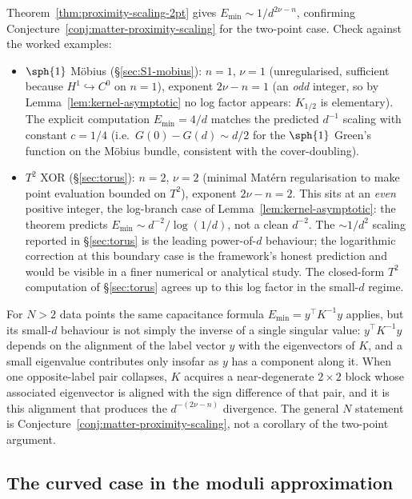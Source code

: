 \begin{remark}
\label{rem:proximity-exponent-check}
Theorem~\ref{thm:proximity-scaling-2pt} gives
$E_{\min}\sim 1/d^{2\nu-n}$, confirming
Conjecture~\ref{conj:matter-proximity-scaling} for the two-point
case. Check against the worked examples:
\begin{itemize}[leftmargin=2em]
\item $\sph{1}$ M\"obius (\S\ref{sec:S1-mobius}): $n=1$, $\nu=1$
(unregularised, sufficient because $H^1\hookrightarrow C^0$ on
$n=1$), exponent $2\nu-n=1$ (an \emph{odd} integer, so by
Lemma~\ref{lem:kernel-asymptotic} no log factor appears: $K_{1/2}$
is elementary). The explicit computation $E_{\min}=4/d$ matches the
predicted $d^{-1}$ scaling with constant $c=1/4$ (i.e.\
$G(0)-G(d)\sim d/2$ for the $\sph{1}$ Green's function on the
M\"obius bundle, consistent with the cover-doubling).
\item $T^2$ XOR (\S\ref{sec:torus}): $n=2$, $\nu=2$ (minimal
Mat\'ern regularisation to make point evaluation bounded on
$T^2$), exponent $2\nu-n=2$. This sits at an \emph{even}
positive integer, the log-branch case of
Lemma~\ref{lem:kernel-asymptotic}: the theorem predicts
$E_{\min}\sim d^{-2}/\log(1/d)$, not a clean $d^{-2}$. The
$\sim 1/d^2$ scaling reported in \S\ref{sec:torus} is the leading
power-of-$d$ behaviour; the logarithmic correction at this
boundary case is the framework's honest prediction and would be
visible in a finer numerical or analytical study. The closed-form
$T^2$ computation of \S\ref{sec:torus} agrees up to this log
factor in the small-$d$ regime.
\end{itemize}
For $N>2$ data points the same capacitance formula
$E_{\min}=y^\top K^{-1}y$ applies, but its small-$d$ behaviour is
not simply the inverse of a single singular value: $y^\top K^{-1}y$
depends on the alignment of the label vector $y$ with the
eigenvectors of $K$, and a small eigenvalue contributes only insofar
as $y$ has a component along it. When one opposite-label pair
collapses, $K$ acquires a near-degenerate $2\times 2$ block whose
associated eigenvector is aligned with the sign difference of that
pair, and it is this alignment that produces the $d^{-(2\nu-n)}$
divergence. The general $N$ statement is Conjecture~\ref{conj:matter-proximity-scaling},
not a corollary of the two-point argument.
\end{remark}


\subsection{The curved case in the moduli approximation}
\label{ssec:proximity-curved}

